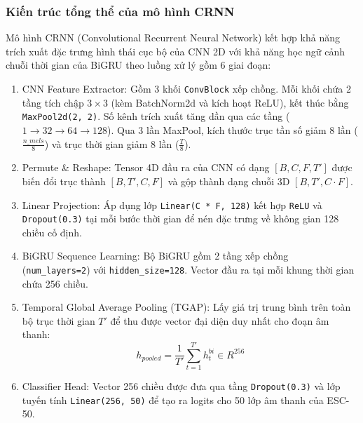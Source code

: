 \documentclass[a4paper,13pt]{extarticle}
\begin{document}
\subsubsection{Kiến trúc tổng thể của mô hình CRNN}
Mô hình CRNN (Convolutional Recurrent Neural Network) kết hợp khả năng trích xuất đặc trưng hình thái cục bộ của CNN 2D với khả năng học ngữ cảnh chuỗi thời gian của BiGRU theo luồng xử lý gồm 6 giai đoạn:

\begin{enumerate}
    \item {CNN Feature Extractor:} Gồm 3 khối \texttt{ConvBlock} xếp chồng. Mỗi khối chứa 2 tầng tích chập $3 \times 3$ (kèm BatchNorm2d và kích hoạt ReLU), kết thúc bằng \texttt{MaxPool2d(2, 2)}. Số kênh trích xuất tăng dần qua các tầng ($1 \to 32 \to 64 \to 128$). Qua 3 lần MaxPool, kích thước trục tần số giảm 8 lần ($\frac{n\_mels}{8}$) và trục thời gian giảm 8 lần ($\frac{T}{8}$).
    \item {Permute \& Reshape:} Tensor 4D đầu ra của CNN có dạng $[B, C, F, T']$ được biến đổi trục thành $[B, T', C, F]$ và gộp thành dạng chuỗi 3D $[B, T', C \cdot F]$.
    \item {Linear Projection:} Áp dụng lớp \texttt{Linear(C * F, 128)} kết hợp \texttt{ReLU} và \texttt{Dropout(0.3)} tại mỗi bước thời gian để nén đặc trưng về không gian 128 chiều cố định.
    \item {BiGRU Sequence Learning:} Bộ BiGRU gồm 2 tầng xếp chồng (\texttt{num\_layers=2}) với \texttt{hidden\_size=128}. Vector đầu ra tại mỗi khung thời gian chứa 256 chiều.
    \item {Temporal Global Average Pooling (TGAP):} Lấy giá trị trung bình trên toàn bộ trục thời gian $T'$ để thu được vector đại diện duy nhất cho đoạn âm thanh:
    \begin{equation}
        {h}_{pooled} = \frac{1}{T'} \sum_{t=1}^{T'} {h}_t^{bi} \in {R}^{256}
    \end{equation}
    \item {Classifier Head:} Vector 256 chiều được đưa qua tầng \texttt{Dropout(0.3)} và lớp tuyến tính \texttt{Linear(256, 50)} để tạo ra logits cho 50 lớp âm thanh của ESC-50.
\end{enumerate}
\end{document}
